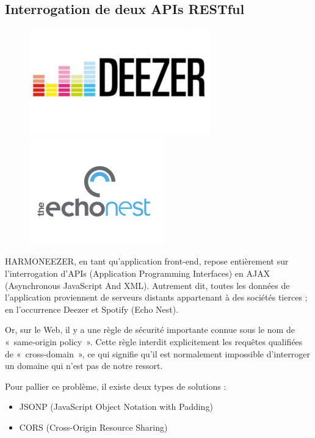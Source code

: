 \documentclass[a4paper,12pt]{article}
\begin{document}
\subsection{Interrogation de deux APIs RESTful}

\begin{figure}[!h]
  \begin{center}
    \includegraphics[scale=0.5]{logo-deezer.jpg}
    \includegraphics[scale=0.5]{logo-echonest.png}
  \end{center}
\end{figure}

HARMONEEZER, en tant qu'application front-end, repose entièrement sur l'interrogation d'APIs (Application Programming Interfaces) en AJAX (Asynchronous JavaScript And XML). Autrement dit, toutes les données de l'application proviennent de serveurs distants appartenant à des sociétés tierces ; en l'occurrence Deezer et Spotify (Echo Nest).

Or, sur le Web, il y a une règle de sécurité importante connue sous le nom de «~same-origin policy~». Cette règle interdit explicitement les requêtes qualifiées de «~cross-domain~», ce qui signifie qu'il est normalement impossible d'interroger un domaine qui n'est pas de notre ressort.

Pour pallier ce problème, il existe deux types de solutions :

\begin{itemize}
 \item{JSONP (JavaScript Object Notation with Padding)}
 \item{CORS (Cross-Origin Resource Sharing)}
\end{itemize}
\end{document}
